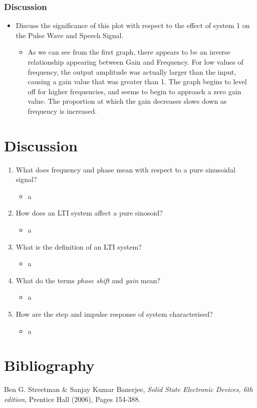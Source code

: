 \documentclass[12pt]{article}
\begin{document}
\subsubsection{Discussion}
\begin{itemize}
\item Discuss the significance of this plot with respect to the effect of system 1 on the Pulse Wave and Speech Signal.
\begin{itemize}
\item As we can see from the first graph, there appears to be an inverse relationship appearing between Gain and Frequency. For low values of frequency, the output amplitude was actually larger than the input, causing a gain value that was greater than 1. The graph begins to level off for higher frequencies, and seems to begin to approach a zero gain value. The proportion at which the gain decreases slows down as frequency is increased.
\end{itemize}
\end{itemize}

\section{Discussion}
\begin{enumerate}
\item What does frequency and phase mean with respect to a pure sinusoidal signal?
\begin{itemize}
\item a
\end{itemize}
\item How does an LTI system affect a pure sinosoid?
\begin{itemize}
\item a
\end{itemize}
\item What is the definition of an LTI system?
\begin{itemize}
\item a
\end{itemize}
\item What do the terms \emph{phase shift} and \emph{gain} mean?
\begin{itemize}
\item a
\end{itemize}
\item How are the step and impulse response of system characterised?
\begin{itemize}
\item a
\end{itemize}
\end{enumerate}

\section{Bibliography}
\begin{thebibliography}{3}
  Ben G. Streetman \& Sanjay Kumar Banerjee,
  \emph{Solid State Electronic Devices, 6th edition},
  Prentice Hall (2006),
  Pages 154-388.
\end{thebibliography}
\end{document}
